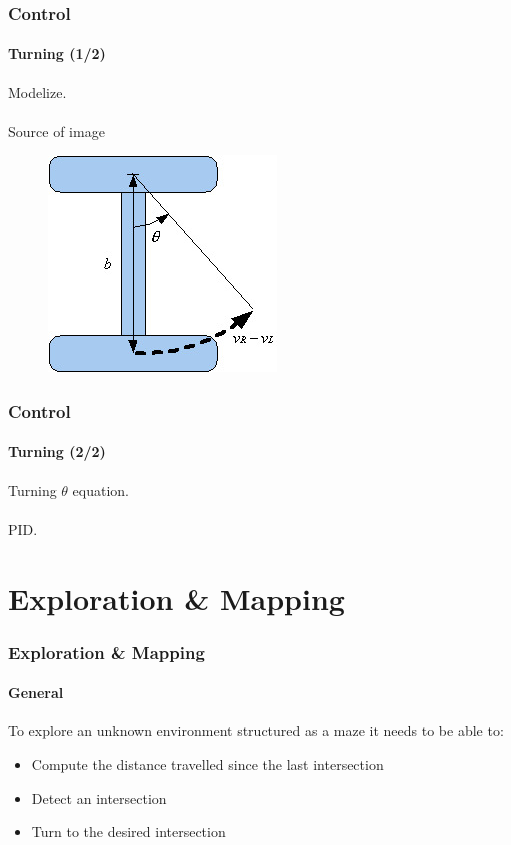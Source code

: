 \documentclass{beamer}
\begin{document}

\begin{frame}
\frametitle{Control}
\framesubtitle{Turning (1/2)}
Modelize.\\~\\
Source of image
\begin{figure}[hbtp]
\centering
\includegraphics[scale=0.5]{figures/differential-system.jpg}
\end{figure}
\end{frame}


\begin{frame}
\frametitle{Control}
\framesubtitle{Turning (2/2)}
Turning $\theta$ equation.\\~\\
PID. 
\end{frame}


\section{Exploration \& Mapping} 


\begin{frame}
\frametitle{Exploration \& Mapping}
\framesubtitle{General}
To explore an unknown environment structured as a maze it needs to be able to:
\begin{itemize}
\item Compute the distance travelled since the last intersection
\item Detect an intersection
\item Turn to the desired intersection
\end{itemize}
\end{frame}
\end{document}
